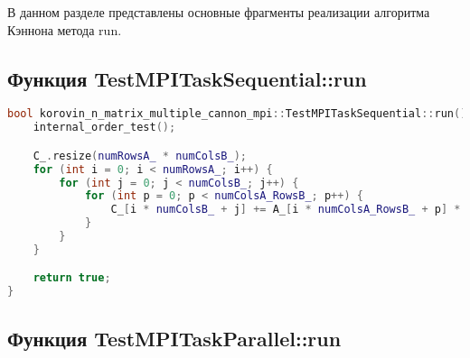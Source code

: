 \documentclass[12pt]{article}
\begin{document}
В данном разделе представлены основные фрагменты реализации алгоритма Кэннона метода run.

\clearpage
\subsection*{Функция TestMPITaskSequential::run}

\begin{lstlisting}[language=C++]
bool korovin_n_matrix_multiple_cannon_mpi::TestMPITaskSequential::run() {
    internal_order_test();

    C_.resize(numRowsA_ * numColsB_);
    for (int i = 0; i < numRowsA_; i++) {
        for (int j = 0; j < numColsB_; j++) {
            for (int p = 0; p < numColsA_RowsB_; p++) {
                C_[i * numColsB_ + j] += A_[i * numColsA_RowsB_ + p] * B_[p * numColsB_ + j];
            }
        }
    }

    return true;
}
\end{lstlisting}

\subsection*{Функция TestMPITaskParallel::run}
\end{document}
